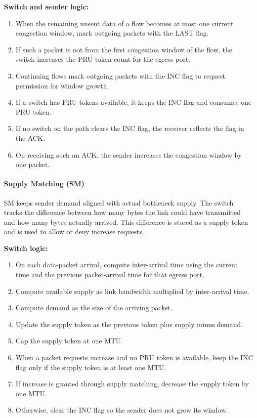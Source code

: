 \textbf{Switch and sender logic:}
\begin{enumerate}
\item When the remaining unsent data of a flow becomes at most one current congestion window, mark outgoing packets with the LAST flag.
\item If such a packet is not from the first congestion window of the flow, the switch increases the PRU token count for the egress port.
\item Continuing flows mark outgoing packets with the INC flag to request permission for window growth.
\item If a switch has PRU tokens available, it keeps the INC flag and consumes one PRU token.
\item If no switch on the path clears the INC flag, the receiver reflects the flag in the ACK.
\item On receiving such an ACK, the sender increases the congestion window by one packet.
\end{enumerate}

\paragraph{Supply Matching (SM)}
SM keeps sender demand aligned with actual bottleneck supply. The switch tracks the difference between how many bytes the link could have transmitted and how many bytes actually arrived. This difference is stored as a supply token and is used to allow or deny increase requests.

\textbf{Switch logic:}
\begin{enumerate}
\item On each data-packet arrival, compute inter-arrival time using the current time and the previous packet-arrival time for that egress port.
\item Compute available supply as link bandwidth multiplied by inter-arrival time.
\item Compute demand as the size of the arriving packet.
\item Update the supply token as the previous token plus supply minus demand.
\item Cap the supply token at one MTU.
\item When a packet requests increase and no PRU token is available, keep the INC flag only if the supply token is at least one MTU.
\item If increase is granted through supply matching, decrease the supply token by one MTU.
\item Otherwise, clear the INC flag so the sender does not grow its window.
\end{enumerate}

